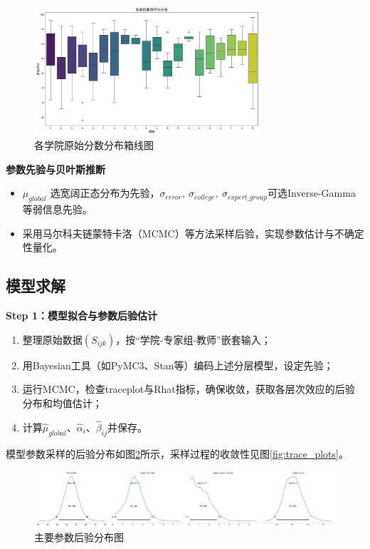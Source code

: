 \documentclass[withoutpreface,bwprint]{cumcmthesis}
\begin{document}
\begin{figure}[H]
\centering
\includegraphics[width=0.75\textwidth]{figures/EDA/college_scores_boxplot.png}
\caption{各学院原始分数分布箱线图}
\label{fig:college_scores_boxplot}
\end{figure}

\textbf{参数先验与贝叶斯推断}
\begin{itemize}
    \item $\mu_{global}$ 选宽阔正态分布为先验，$\sigma_{error},\ \sigma_{college},\ \sigma_{expert\_group}$可选Inverse-Gamma等弱信息先验。
    \item 采用马尔科夫链蒙特卡洛（MCMC）等方法采样后验，实现参数估计与不确定性量化。
\end{itemize}

\subsection{模型求解}
\textbf{Step 1：模型拟合与参数后验估计}
\begin{enumerate}
    \item 整理原始数据$(S_{ijk})$，按“学院-专家组-教师”嵌套输入；
    \item 用Bayesian工具（如PyMC3、Stan等）编码上述分层模型，设定先验；
    \item 运行MCMC，检查traceplot与Rhat指标，确保收敛，获取各层次效应的后验分布和均值估计；
    \item 计算$\widehat{\mu}_{global}$、$\widehat{\alpha}_{i}$、$\widehat{\beta}_{ij}$并保存。
\end{enumerate}

模型参数采样的后验分布如图\ref{fig:posterior_plots}所示，采样过程的收敛性见图\ref{fig:trace_plots}。

\begin{figure}[H]
\centering
\includegraphics[width=1\textwidth]{figures/Diagnostics/posterior_plots.png}
\caption{主要参数后验分布图}
\label{fig:posterior_plots}
\end{figure}
\end{document}
